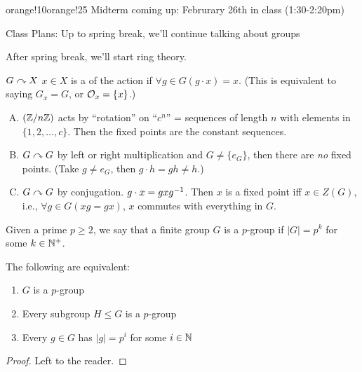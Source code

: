 \documentclass[notes.tex]{subfiles}
\begin{document}
\begin{classnote}{orange!10}{orange!25}
Midterm coming up: Februrary 26th in class (1:30-2:20pm)

Class Plans: Up to spring break, we'll continue talking about groups

After spring break, we'll start ring theory.
\end{classnote}

\begin{defn}
	$G\curvearrowright X$ $x\in X$ is a  of the action if $\forall g\in G (g\cdot x) = x$. (This is equivalent to saying $G_x = G$, or $\mathcal{O}_x = \{x\}$.)
\end{defn}

\begin{eg}\leavevmode
	\begin{enumerate}[(A)]
		\item $(\mathbb{Z}/{n}\mathbb{Z})$ acts by ``rotation'' on ``$c^n$'' = sequences of length $n$ with elements in $\{1, 2, \ldots, c\}$. Then the fixed points are the constant sequences.
		\item $G\curvearrowright G$ by left or right multiplication and $G\ne \{e_G\}$, then there are \emph{no} fixed points. (Take $g\ne e_G$, then $g\cdot h = gh \ne h$.)
		\item $G\curvearrowright G$ by conjugation. $g\cdot x = gx{g}^{-1}$. Then $x$ is a fixed point iff $x\in Z(G)$, i.e., $\forall g\in G (xg = gx)$, $x$ commutes with everything in $G$.
	\end{enumerate}
\end{eg}

\begin{defn}
	Given a prime $p\ge 2$, we say that a finite group $G$ is a $p$-group if $|G| = p^k$ for some $k\in\mathbb{N}^+$.
\end{defn}

\begin{proposition}
	The following are equivalent:
	\begin{enumerate}
		\item $G$ is a $p$-group
		\item Every subgroup $H\le G$ is a $p$-group
		\item Every $g\in G$ has $|g| = p^i$ for some $i\in\mathbb{N}$
	\end{enumerate}
\end{proposition}
\begin{proof}
	Left to the reader.
\end{proof}
\end{document}
